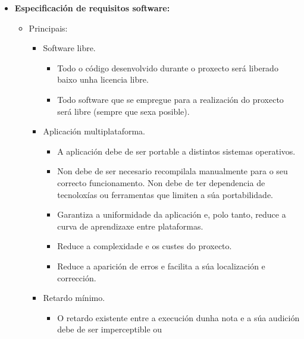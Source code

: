   \begin{itemize}
   \item \textbf{Especificación de requisitos software:}
         \begin{itemize}
          \item Principais:
                \begin{itemize}
                 \item Software libre.
                       \begin{itemize}
                        \item Todo o código desenvolvido durante o proxecto
                              será liberado baixo unha licencia libre.
                        \item Todo software que se empregue para a realización
                              do proxecto será libre  (sempre que sexa
                              posible).
                       \end{itemize}
                 \item Aplicación multiplataforma.
                       \begin{itemize}
                        \item A aplicación debe de ser portable a distintos
                              sistemas operativos.
                        \item Non debe de ser necesario recompilala manualmente
                              para o seu correcto funcionamento.
                              Non debe de ter dependencia de tecnoloxías ou
                              ferramentas que limiten a súa portabilidade.
                        \item Garantiza a uniformidade da aplicación e, polo
                              tanto, reduce a curva de aprendizaxe entre
                              plataformas.
                        \item Reduce a complexidade e os custes do proxecto.
                        \item Reduce a aparición de erros e facilita a súa
                              localización e corrección.
                       \end{itemize}
                 \item Retardo mínimo.
                       \begin{itemize}
                        \item O retardo existente entre a execución dunha nota
                              e a súa audición debe de ser imperceptible ou

\end{itemize}
\end{itemize}
\end{itemize}
\end{itemize}
